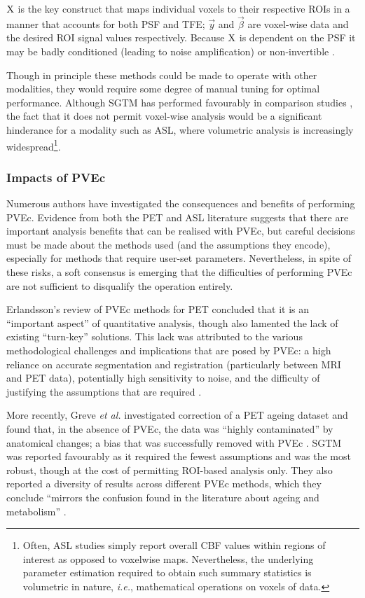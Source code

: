 $\mathrm{X}$ is the key construct that maps individual voxels to their respective ROIs in a manner that accounts for both PSF and TFE; $\vec{y}$ and $\vec{\beta}$ are voxel-wise data and the desired ROI signal values respectively. Because $\mathrm{X}$ is dependent on the PSF it may be badly conditioned (leading to noise amplification) or non-invertible \cite{Greve2016}. 

Though in principle these methods could be made to operate with other modalities, they would require some degree of manual tuning for optimal performance. Although SGTM has performed favourably in comparison studies \cite{Greve2016}, the fact that it does not permit voxel-wise analysis would be a significant hinderance for a modality such as ASL, where volumetric analysis is increasingly widespread\footnote{Often, ASL studies simply report overall CBF values within regions of interest as opposed to voxelwise maps. Nevertheless, the underlying parameter estimation required to obtain such summary statistics is volumetric in nature, \textit{i.e.}, mathematical operations on voxels of data.}.

\subsubsection{Impacts of PVEc}

Numerous authors have investigated the consequences and benefits of performing PVEc. Evidence from both the PET and ASL literature suggests that there are important analysis benefits that can be realised with PVEc, but careful decisions must be made about the methods used (and the assumptions they encode), especially for methods that require user-set parameters. Nevertheless, in spite of these risks, a soft consensus is emerging that the difficulties of performing PVEc are not sufficient to disqualify the operation entirely. 

Erlandsson's review of PVEc methods for PET concluded that it is an ``important aspect'' of quantitative analysis, though also lamented the lack of existing ``turn-key'' solutions. This lack was attributed to the various methodological challenges and implications that are posed by PVEc: a high reliance on accurate segmentation and registration (particularly between MRI and PET data), potentially high sensitivity to noise, and the difficulty of justifying the assumptions that are required \cite{Erlandsson2012}.  

More recently, Greve \textit{et al.} investigated correction of a PET ageing dataset and found that, in the absence of PVEc, the data was ``highly contaminated'' by anatomical changes; a bias that was successfully removed with PVEc \cite{Greve2016}. SGTM was reported favourably as it required the fewest assumptions and was the most robust, though at the cost of permitting ROI-based analysis only. They also reported a diversity of results across different PVEc methods, which they conclude ``mirrors the confusion found in the literature about ageing and metabolism'' \cite{Greve2016}. 

